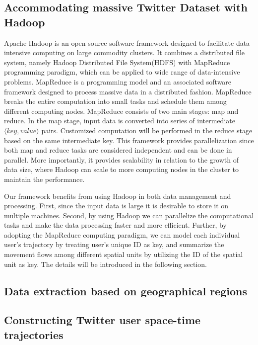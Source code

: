 \documentclass[a4paper,11pt]{article}
\begin{document}
\subsection*{Accommodating massive Twitter Dataset with Hadoop}
Apache Hadoop is an open source software framework designed to facilitate data intensive computing on large commodity clusters.
It combines a distributed file system, namely Hadoop Distributed File System(HDFS) with MapReduce programming paradigm, which can be applied to wide range of data-intensive problems.
MapReduce is a programming model and an associated software framework designed to process massive data in a distributed fashion.
MapReduce breaks the entire computation into small tasks and schedule them among different computing nodes.
MapReduce consists of two main stages: map and reduce.
In the map stage, input data is converted into series of intermediate $\langle key, value\rangle$ pairs.
Customized computation will be performed in the reduce stage based on the same intermediate key.
This framework provides parallelization since both map and reduce tasks are considered independent and can be done in parallel. More importantly, it provides scalability in relation to the growth of data size, where Hadoop can scale to more computing nodes in the cluster to maintain the performance.

Our framework benefits from using Hadoop in both data management and processing.
First, since the input data is large it is desirable to store it on multiple machines.
Second, by using Hadoop we can parallelize the computational tasks and make the data processing faster and more efficient.
Further, by adopting the MapReduce computing paradigm, we can model each individual user's trajectory by treating user's unique ID as key, and summarize the movement flows among different spatial units by utilizing the ID of the spatial unit as key. The details will be introduced in the following section.

\subsection*{Data extraction based on geographical regions}


\subsection*{Constructing Twitter user space-time trajectories}
\end{document}

